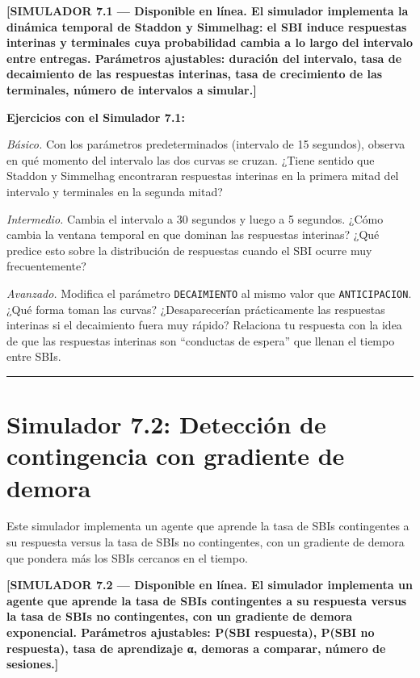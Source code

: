 \documentclass[
  letterpaper,
  DIV=11,
  numbers=noendperiod]{scrreprt}
\begin{document}
\begin{tcolorbox}[enhanced jigsaw, toprule=.15mm, arc=.35mm, colback=white, opacityback=0, colframe=quarto-callout-note-color-frame, breakable, rightrule=.15mm, left=2mm, leftrule=.75mm, bottomrule=.15mm]
\textbf{{[}SIMULADOR 7.1 --- Disponible en línea. El simulador
implementa la dinámica temporal de Staddon y Simmelhag: el SBI induce
respuestas interinas y terminales cuya probabilidad cambia a lo largo
del intervalo entre entregas. Parámetros ajustables: duración del
intervalo, tasa de decaimiento de las respuestas interinas, tasa de
crecimiento de las terminales, número de intervalos a simular.{]}}

\textbf{Ejercicios con el Simulador 7.1:}

\emph{Básico.} Con los parámetros predeterminados (intervalo de 15
segundos), observa en qué momento del intervalo las dos curvas se
cruzan. ¿Tiene sentido que Staddon y Simmelhag encontraran respuestas
interinas en la primera mitad del intervalo y terminales en la segunda
mitad?

\emph{Intermedio.} Cambia el intervalo a 30 segundos y luego a 5
segundos. ¿Cómo cambia la ventana temporal en que dominan las respuestas
interinas? ¿Qué predice esto sobre la distribución de respuestas cuando
el SBI ocurre muy frecuentemente?

\emph{Avanzado.} Modifica el parámetro \texttt{DECAIMIENTO} al mismo
valor que \texttt{ANTICIPACION}. ¿Qué forma toman las curvas?
¿Desaparecerían prácticamente las respuestas interinas si el decaimiento
fuera muy rápido? Relaciona tu respuesta con la idea de que las
respuestas interinas son ``conductas de espera'' que llenan el tiempo
entre SBIs.

\begin{center}\rule{0.5\linewidth}{0.5pt}\end{center}

\section{Simulador 7.2: Detección de contingencia con gradiente de
demora}\label{simulador-7.2-detecciuxf3n-de-contingencia-con-gradiente-de-demora}

Este simulador implementa un agente que aprende la tasa de SBIs
contingentes a su respuesta versus la tasa de SBIs no contingentes, con
un gradiente de demora que pondera más los SBIs cercanos en el tiempo.

\textbf{{[}SIMULADOR 7.2 --- Disponible en línea. El simulador
implementa un agente que aprende la tasa de SBIs contingentes a su
respuesta versus la tasa de SBIs no contingentes, con un gradiente de
demora exponencial. Parámetros ajustables: P(SBI \textbar{} respuesta),
P(SBI \textbar{} no respuesta), tasa de aprendizaje α, demoras a
comparar, número de sesiones.{]}}


\end{tcolorbox}
\end{document}
